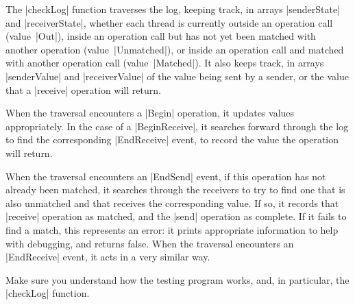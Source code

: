 The |checkLog| function traverses the log, keeping track, in arrays
|senderState| and |receiverState|, whether each thread is currently outside an
operation call (value~|Out|), inside an operation call but has not yet been
matched with another operation (value~|Unmatched|), or inside an operation
call and matched with another operation call (value~|Matched|).  It also keeps
track, in arrays |senderValue| and |receiverValue| of the value being sent by
a sender, or the value that a |receive| operation will return.

When the traversal encounters a |Begin| operation, it updates values
appropriately.  In the case of a |BeginReceive|, it searches forward through
the log to find the corresponding |EndReceive| event, to record the value the
operation will return.

When the traversal encounters an |EndSend| event, if this operation has not
already been matched, it searches through the receivers to try to find one
that is also unmatched and that receives the corresponding value.  If so, it
records that |receive| operation as matched, and the |send| operation as
complete.  If it fails to find a match, this represents an error: it prints
appropriate information to help with debugging, and returns false.  When the
traversal encounters an |EndReceive| event, it acts in a very similar way.

\begin{instruction}
Make sure you understand how the testing program works, and, in particular,
the |checkLog| function.
\end{instruction}




